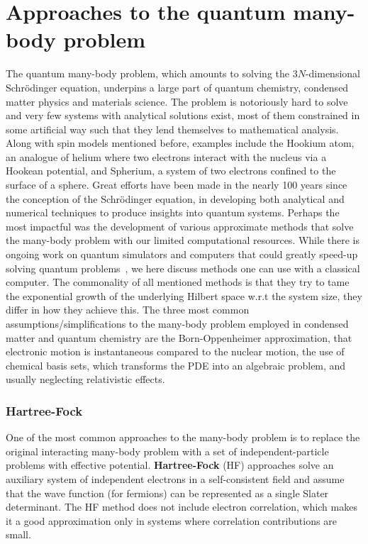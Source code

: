 \section{Approaches to the quantum many-body problem}
\label{sec:QMBP}
The quantum many-body problem, which amounts to solving the $3N$-dimensional Schr\"odinger equation, underpins a large part of quantum chemistry, condensed matter physics and materials science. The problem is notoriously hard to solve and very few systems with analytical solutions exist, most of them constrained in some artificial way such that they lend themselves to mathematical analysis. Along with spin models mentioned before, examples include the Hookium atom, an analogue of helium where two electrons interact with the nucleus via a Hookean potential, and Spherium, a system of two electrons confined to the surface of a sphere. Great efforts have been made in the nearly 100 years since the conception of the Schr\" odinger equation, in developing both analytical and numerical techniques to produce insights into quantum systems. Perhaps the most impactful was the development of various approximate methods that solve the many-body problem with our limited computational resources. While there is ongoing work on quantum simulators and computers that could greatly speed-up solving quantum problems~\cite{feynman2018simulating, childs2010relationship}, we here discuss methods one can use with a classical computer. The commonality of all mentioned methods is that they try to tame the exponential growth of the underlying Hilbert space w.r.t the system size, they differ in how they achieve this. The three most common assumptions/simplifications to the many-body problem employed in condensed matter and quantum chemistry are the Born-Oppenheimer approximation, that electronic motion is instantaneous compared to the nuclear motion, the use of chemical basis sets, which transforms the PDE into an algebraic problem, and usually neglecting relativistic effects.

\subsubsection{Hartree-Fock}
One of the most common approaches to the many-body problem is to replace the original interacting many-body problem with a set of independent-particle problems with effective potential. \textbf{Hartree-Fock} (HF) approaches solve an auxiliary system of independent electrons in a self-consistent field and assume that the wave function (for fermions) can be represented as a single Slater determinant. The HF method does not include electron correlation, which makes it a good approximation only in systems where correlation contributions are small. 

